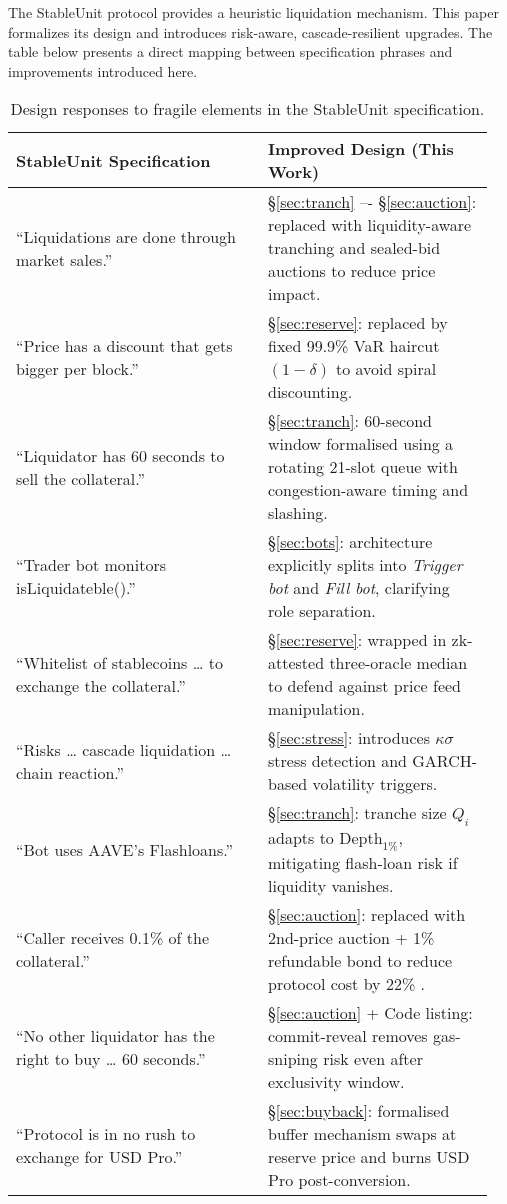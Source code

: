 \documentclass[11pt]{article}
\newcommand{\secref}[1]{§\hyperref[#1]{\ref*{#1}}}
\begin{document}
The StableUnit protocol \parencite{stableunit2025spec} provides a heuristic liquidation mechanism. This paper formalizes its design and introduces risk-aware, cascade-resilient upgrades. The table below presents a direct mapping between specification phrases and improvements introduced here.
\begin{table}[ht]
\centering
\caption{Design responses to fragile elements in the StableUnit specification.}
\label{tab:trigger-map}

\begin{tabular}{@{}p{0.5\linewidth} p{0.45\linewidth}@{}}
\toprule
\textbf{StableUnit Specification} & \textbf{Improved Design (This Work)} \\
\midrule
“Liquidations are done through market sales.” & \secref{sec:tranch} –- \secref{sec:auction}: replaced with liquidity-aware tranching and sealed-bid auctions to reduce price impact. \\
“Price has a discount that gets bigger per block.” & \secref{sec:reserve}: replaced by fixed 99.9\% VaR haircut $(1 - \delta)$ to avoid spiral discounting. \\
“Liquidator has 60 seconds to sell the collateral.” & \secref{sec:tranch}: 60-second window formalised using a rotating 21-slot queue with congestion-aware timing and slashing. \\
“Trader bot monitors isLiquidateble().” & \secref{sec:bots}: architecture explicitly splits into \textit{Trigger bot} and \textit{Fill bot}, clarifying role separation. \\
“Whitelist of stablecoins … to exchange the collateral.” & \secref{sec:reserve}: wrapped in zk-attested three-oracle median to defend against price feed manipulation. \\
“Risks … cascade liquidation … chain reaction.” & \secref{sec:stress}: introduces $\kappa\sigma$ stress detection and GARCH-based volatility triggers. \\
“Bot uses AAVE’s Flashloans.” & \secref{sec:tranch}: tranche size $Q_i$ adapts to $\text{Depth}_{1\%}$, mitigating flash-loan risk if liquidity vanishes. \\
“Caller receives 0.1\% of the collateral.” & \secref{sec:auction}: replaced with 2nd-price auction + 1\% refundable bond to reduce protocol cost by 22\% \parencite{tian2025defi}. \\
“No other liquidator has the right to buy … 60 seconds.” & \secref{sec:auction} + Code listing: commit-reveal removes gas-sniping risk even after exclusivity window. \\
“Protocol is in no rush to exchange for USD Pro.” &  \secref{sec:buyback}: formalised buffer mechanism swaps at reserve price and burns USD Pro post-conversion. \\
\bottomrule
\end{tabular}
\end{table}
\end{document}
